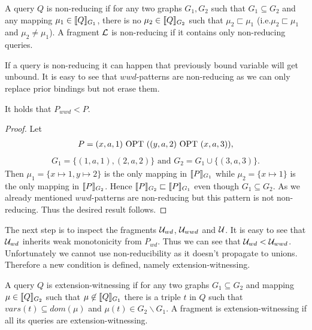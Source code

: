 \begin{definition}
	A query $Q$ is non-reducing if for any two graphs $G_1,G_2$ such that $G_1
	\subseteq G_2$ and any mapping $\mu_1 \in \llbracket Q \rrbracket_{G_1}$, there is no
	$\mu_2 \in \llbracket Q \rrbracket_{G_2}$ such that $\mu_2 \sqsubset \mu_1$ (i.e.$\mu_2
	\sqsubset \mu_1$ and $\mu_2 \neq \mu_1$).
	A fragment $\mathcal{L}$ is non-reducing if it contains only non-reducing queries.
\end{definition}

If a query is non-reducing it can happen that previously bound variable will get
unbound. It is easy to see that $wwd$-patterns are non-reducing as we can only
replace prior bindings but not erase them.

\begin{theorem}
	It holds that $P_{wwd} < P$.
\end{theorem}
\begin{proof}
	Let 
	\begin{align*}
		P = (x, a, 1) \mbox{ OPT } ((y,a,2) \mbox{ OPT }(x,a,3)),
	\end{align*}
	\begin{align*}
		G_1 = \{(1,a,1),(2,a,2)\} \mbox{ and } G_2 = G_1 \cup \{(3,a,3)\}.
	\end{align*}
	Then $\mu_1 = \{x \mapsto 1, y \mapsto 2\}$ is the only mapping in $\llbracket
	P\rrbracket_{G_1}$ while $\mu_2 = \{x \mapsto 1\}$ is the only mapping in $\llbracket P
	\rrbracket_{G_2}$. Hence $\llbracket P \rrbracket_{G_2} \sqsubset \llbracket P \rrbracket_{G_1}$ even though
	$G_1 \subseteq G_2$. As we already mentioned $wwd$-patterns are non-reducing
	but this pattern is not non-reducing. Thus the desired result follows.
\end{proof}

The next step is to inspect the fragments $\mathcal{U}_{wd}$, $\mathcal{U}_{wwd}$ and $\mathcal{U}$.
It is easy to see that $\mathcal{U}_{wd}$ inherits weak monotonicity from
$P_{wd}$. Thus we can see that $\mathcal{U}_{wd} < \mathcal{U}_{wwd}$.
Unfortunately we cannot use non-reducibility as it doesn't propagate to unions.
Therefore a new condition is defined, namely extension-witnessing.

\begin{definition}
	A query $Q$ is extension-witnessing if for any two graphs $G_1 \subseteq
	G_2$ and mapping $\mu \in \llbracket Q \rrbracket_{G_2}$ such that $\mu \not \in \llbracket Q
	\rrbracket_{G_1}$ there is a triple $t$ in $Q$ such that $vars(t) \subseteq
	dom(\mu)$ and $\mu(t) \in G_2 \backslash G_1$. A fragment is
	extension-witnessing if all its queries are extension-witnessing.
\end{definition}

